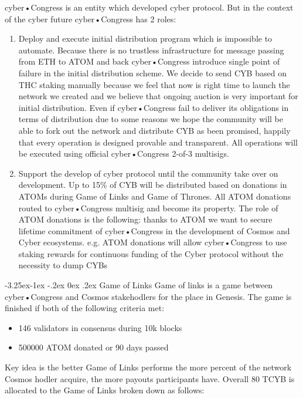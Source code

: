 \documentclass[8pt,oneside]{amsart}
\makeatletter
\renewcommand\subsection{\@startsection{subsection}{2}{\z@}%
                                     {-3.25ex\@plus -1ex \@minus -.2ex}%
                                     {0ex \@plus .2ex}%
                                     {\play\Large}}%
\newcommand{\titleSection}[1]{\subsection{#1}}
\makeatother
\begin{document}
cyber•Congress is an entity which developed cyber protocol. But in the context of the cyber future cyber•Congress has 2 roles:
\begin{enumerate}
 \item Deploy and execute initial distribution program which is impossible to automate. Because there is no trustless infrastructure for message passing from ETH to ATOM and back cyber•Congress introduce single point of failure in the initial distribution scheme. We decide to send CYB based on THC staking manually because we feel that now is right time to launch the network we created and we believe that ongoing auction is very important for initial distribution. Even if cyber•Congress fail to deliver its obligations in terms of distribution due to some reasons we hope the community will be able to fork out the network and distribute CYB as been promised, happily that every operation is designed provable and transparent. All operations will be executed using official cyber•Congress 2-of-3 multisigs.
 \item Support the develop of cyber protocol until the community take over on development. Up to 15\% of CYB will be distributed based on donations in ATOMs during Game of Links and Game of Thrones. All ATOM donations routed to cyber•Congress multisig and become its property. The role of ATOM donations is the following: thanks to ATOM we want to secure lifetime commitment of cyber•Congress in the development of Cosmos and Cyber ecosystems. e.g. ATOM donations will allow cyber•Congress to use staking rewards for continuous funding of the Cyber protocol without the necessity to dump CYBs
\end{enumerate}

\titleSection{Game of Links}\label{gol}
Game of links is a game between cyber•Congress and Cosmos stakehodlers for the place in Genesis. The game is finished if both of the following criteria met:
\begin{itemize}
\item 146 validators in consensus during 10k blocks
\item 500000 ATOM donated or 90 days passed
\end{itemize}

Key idea is the better Game of Links performs the more percent of the network Cosmos hodler acquire, the more payouts participants have. Overall 80 TCYB is allocated to the Game of Links broken down as follows:
\end{document}
